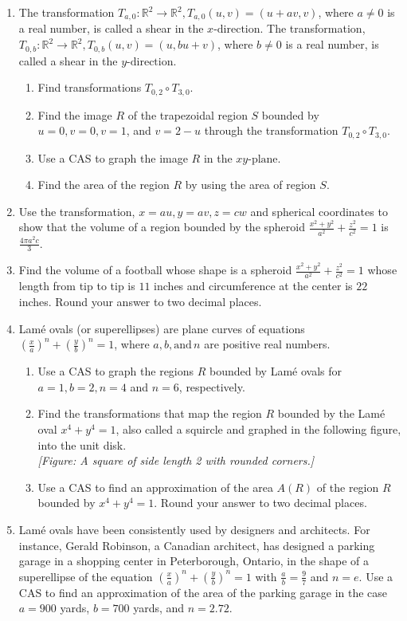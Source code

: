 \documentclass{exercises}
\begin{document}
\begin{enumerate}[resume]
\item \techrequired The transformation $T_{a,0}:\mathbb{R}^{2}\to \mathbb{R}^{2},T_{a,0}(u,v)=(u+av,v)$, where $a\ne0$ is a real number, is called a shear in the $x\text{-direction}$. The transformation, $T_{0,b}:\mathbb{R}^{2}\to \mathbb{R}^{2},T_{0,b}(u,v)=(u,bu+v)$, where $b\ne0$ is a real number, is called a shear in the $y\text{-direction}$.
\begin{enumerate}[label=(\alph*)]
  \item Find transformations $T_{0,2}\circ T_{3,0}$.
  \item Find the image $R$ of the trapezoidal region $S$ bounded by $u=0,v=0,v=1$, and $v=2-u$ through the transformation $T_{0,2}\circ T_{3,0}$.
  \item Use a CAS to graph the image $R$ in the $xy\text{-plane}$.
  \item Find the area of the region $R$ by using the area of region $S$.
\end{enumerate}
\item Use the transformation, $x=au,y=av,z=cw$ and spherical coordinates to show that the volume of a region bounded by the spheroid $\frac{x^{2}+y^{2}}{a^{2}}+\frac{z^{2}}{c^{2}}=1$ is $\frac{4\pi a^{2}c}{3}$.
\item Find the volume of a football whose shape is a spheroid $\frac{x^{2}+y^{2}}{a^{2}}+\frac{z^{2}}{c^{2}}=1$ whose length from tip to tip is $11$ inches and circumference at the center is $22$ inches. Round your answer to two decimal places.
\item \techrequired Lamé ovals (or superellipses) are plane curves of equations ${(\frac{x}{a})}^{n}+{(\frac{y}{b})}^{n}=1$, where $a,b,\text{and}\,n$ are positive real numbers.
\begin{enumerate}[label=(\alph*)]
  \item Use a CAS to graph the regions $R$ bounded by Lamé ovals for $a=1,b=2,n=4$ and $n=6$, respectively.
  \item Find the transformations that map the region $R$ bounded by the Lamé oval $x^{4}+y^{4}=1$, also called a squircle and graphed in the following figure, into the unit disk.\\ \textit{[Figure: A square of side length 2 with rounded corners.]}
  \item Use a CAS to find an approximation of the area $A(R)$ of the region $R$ bounded by $x^{4}+y^{4}=1$. Round your answer to two decimal places.
\end{enumerate}
\item \techrequired Lamé ovals have been consistently used by designers and architects. For instance, Gerald Robinson, a Canadian architect, has designed a parking garage in a shopping center in Peterborough, Ontario, in the shape of a superellipse of the equation ${(\frac{x}{a})}^{n}+{(\frac{y}{b})}^{n}=1$ with $\frac{a}{b}=\frac{9}{7}$ and $n=e$. Use a CAS to find an approximation of the area of the parking garage in the case $a=900$ yards, $b=700$ yards, and $n=2.72$.
\end{enumerate}
\end{document}
